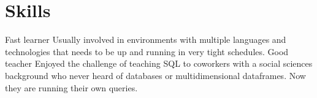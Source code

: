 \documentclass[]{cv-style}          %
\begin{document}
\section{Skills}
\begin{entrylist}
\entry
  {}
  {Fast learner}
  {}
  {Usually involved in environments with multiple languages and technologies that needs to be up and running in very tight schedules.}
\entry
  {}
  {Good teacher}
  {}
  {Enjoyed the challenge of teaching SQL to coworkers with a social sciences background who never heard of databases or multidimensional dataframes. Now they are running their own queries.}
\end{entrylist}
\end{document}
